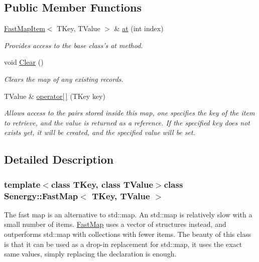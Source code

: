 \subsection*{Public Member Functions}
\begin{DoxyCompactItemize}
\item 
\hyperlink{struct_senergy_1_1_fast_map_item}{Fast\-Map\-Item}$<$ T\-Key, T\-Value $>$ \& \hyperlink{class_senergy_1_1_fast_map_a869e057da1eeb6d54f510e1302a8b7a1}{at} (int index)
\begin{DoxyCompactList}\small\item\em Provides access to the base class's at method. \end{DoxyCompactList}\item 
void \hyperlink{class_senergy_1_1_fast_map_a2391a47cf91bcc3561837800777ae91f}{Clear} ()
\begin{DoxyCompactList}\small\item\em Clears the map of any existing records. \end{DoxyCompactList}\item 
T\-Value \& \hyperlink{class_senergy_1_1_fast_map_ac06929fda5af594e6ccf96198eac1819}{operator\mbox{[}$\,$\mbox{]}} (T\-Key key)
\begin{DoxyCompactList}\small\item\em Allows access to the pairs stored inside this map, one specifies the key of the item to retrieve, and the value is returned as a reference. If the specified key does not exists yet, it will be created, and the specified value will be set. \end{DoxyCompactList}\end{DoxyCompactItemize}


\subsection{Detailed Description}
\subsubsection*{template$<$class T\-Key, class T\-Value$>$class Senergy\-::\-Fast\-Map$<$ T\-Key, T\-Value $>$}

The fast map is an alternative to std\-::map. An std\-::map is relatively slow with a small number of items. \hyperlink{class_senergy_1_1_fast_map}{Fast\-Map} uses a vector of structures instead, and outperforms std\-::map with collections with fewer items. The beauty of this class is that it can be used as a drop-\/in replacement for std\-::map, it uses the exact same values, simply replacing the declaration is enough. 

